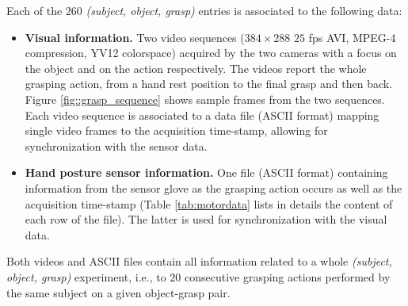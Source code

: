 \documentclass{article}
\begin{document}
Each of the $260$ {\em (subject, object, grasp)} entries is associated to the following data: 

\begin{itemize}

 \item {\bf Visual information.} Two video sequences ($384 \times 288$ $25$ fps
   AVI, MPEG-4 compression, YV12 colorspace) acquired by the two cameras with a
   focus on the object and on the action respectively. The videos report the whole
   grasping action, from a hand rest position to the final grasp and then back.
   Figure \ref{fig::grasp_sequence} shows sample frames from the two sequences.
   Each video sequence is associated to a data file (ASCII format) mapping
   single video frames to the acquisition time-stamp, allowing for synchronization
   with the sensor data.

 \item {\bf Hand posture sensor information.} One file (ASCII format) containing
   information from the sensor glove as the grasping action occurs as well as the
   acquisition time-stamp (Table \ref{tab:motordata} lists in details the content
   of each row of the file). The latter is used for synchronization with the visual data.

\end{itemize}		

Both videos and ASCII files contain all information related to a whole
{\em (subject, object, grasp)} experiment, i.e., to $20$ consecutive 
grasping actions performed by the same subject on a given object-grasp pair.
\end{document}
